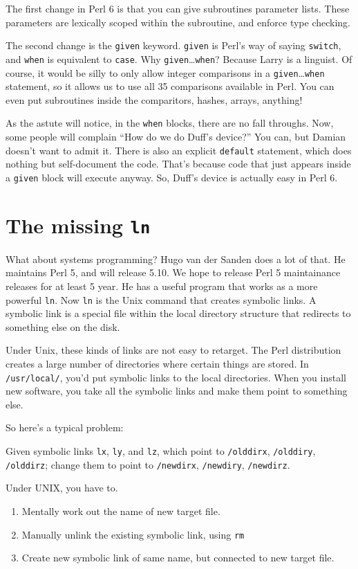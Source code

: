 \documentclass{article}
\begin{document}
The first change in Perl 6 is that you can give subroutines parameter
lists.  These parameters are lexically scoped within the subroutine, and
enforce type checking.

The second change is the \verb'given' keyword.  \verb'given' is Perl's
way of saying \verb'switch', and \verb'when' is equivalent to
\verb'case'.  Why \verb'given'\ldots \verb'when'?  Because Larry is a
linguist.  Of course, it would be silly to only allow integer
comparisons in a \verb'given'\ldots\verb'when' statement, so it allows
us to use all 35 comparisons available in Perl.  You can even put
subroutines inside the comparitors, hashes, arrays, anything!  

As the astute will notice, in the \verb'when' blocks, there are no fall
throughs.  Now, some people will complain ``How do we do Duff's
device?'' You can, but Damian doesn't want to admit it.  There is also
an explicit \verb'default' statement, which does nothing but
self-document the code.  That's because code that just appears inside a
\verb'given' block will execute anyway.  So, Duff's device is actually
easy in Perl 6.

\section{The missing \texttt{ln}}
What about systems programming?  Hugo van der Sanden does a lot of that.
He maintains Perl 5, and will release 5.10.  We hope to release Perl 5
maintainance releases for at least 5 year.  He has a useful program that
works as a more powerful \verb'ln'.   Now \verb'ln' is the Unix command
that creates symbolic links.  A symbolic link is a special file within
the local directory structure that redirects to something else on the
disk.

Under Unix, these kinds of links are not easy to retarget.  The Perl
distribution creates a large number of directories where certain things
are stored.  In \verb'/usr/local/', you'd put symbolic links to the
local directories.  When you install new software, you take all the
symbolic links and make them point to something else.

So here's a typical problem: 

Given symbolic links \verb'lx', \verb'ly', and \verb'lz', which point 
to \verb'/olddirx', \verb'/olddiry', \verb'/olddirz'; change them to
point to \verb'/newdirx',
\verb'/newdiry', \verb'/newdirz'.

Under UNIX, you have to.
\begin{enumerate}
\item Mentally work out the name of new target file.
\item Manually unlink the existing symbolic link, using \verb'rm'
\item Create new symbolic link of same name, but connected to new target file.
\end{enumerate}
\end{document}

